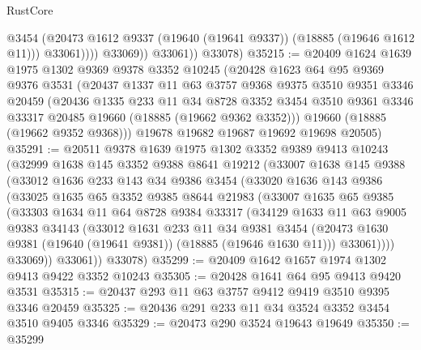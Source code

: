 \begin{lexlean}{RustCore}
\begin{coremodule}
                      @3454
                      (@20473 @1612 @9337 (@19640 (@19641 @9337)) (@18885 (@19646 @1612 @11)))
                      @33061))))
              @33069))
          @33061))
      @33078)
@35215 := @20409
    @1624
    @1639
    @1975
    @1302
    @9369
    @9378
    @3352
    @10245
    (@20428
      @1623
      @64
      @95
      @9369
      @9376
      @3531
      (@20437
        @1337
        @11
        @63
        @3757
        @9368
        @9375
        @3510
        @9351
        @3346
        @20459
        (@20436
          @1335
          @233
          @11
          @34
          @8728
          @3352
          @3454
          @3510
          @9361
          @3346
          @33317
          @20485
          @19660
          (@18885 (@19662 @9362 @3352)))
        @19660
        (@18885 (@19662 @9352 @9368)))
      @19678
      @19682
      @19687
      @19692
      @19698
      @20505)
@35291 := @20511
    @9378
    @1639
    @1975
    @1302
    @3352
    @9389
    @9413
    @10243
    (@32999
      @1638
      @145
      @3352
      @9388
      @8641
      @19212
      (@33007
        @1638
        @145
        @9388
        (@33012
          @1636
          @233
          @143
          @34
          @9386
          @3454
          (@33020
            @1636
            @143
            @9386
            (@33025
              @1635
              @65
              @3352
              @9385
              @8644
              @21983
              (@33007
                @1635
                @65
                @9385
                (@33303
                  @1634
                  @11
                  @64
                  @8728
                  @9384
                  @33317
                  (@34129
                    @1633
                    @11
                    @63
                    @9005
                    @9383
                    @34143
                    (@33012
                      @1631
                      @233
                      @11
                      @34
                      @9381
                      @3454
                      (@20473 @1630 @9381 (@19640 (@19641 @9381)) (@18885 (@19646 @1630 @11)))
                      @33061))))
              @33069))
          @33061))
      @33078)
@35299 := @20409 @1642 @1657 @1974 @1302 @9413 @9422 @3352 @10243
@35305 := @20428 @1641 @64 @95 @9413 @9420 @3531
@35315 := @20437 @293 @11 @63 @3757 @9412 @9419 @3510 @9395 @3346 @20459
@35325 := @20436 @291 @233 @11 @34 @3524 @3352 @3454 @3510 @9405 @3346
@35329 := @20473 @290 @3524 @19643 @19649
@35350 := @35299

\end{coremodule}
\end{lexlean}
